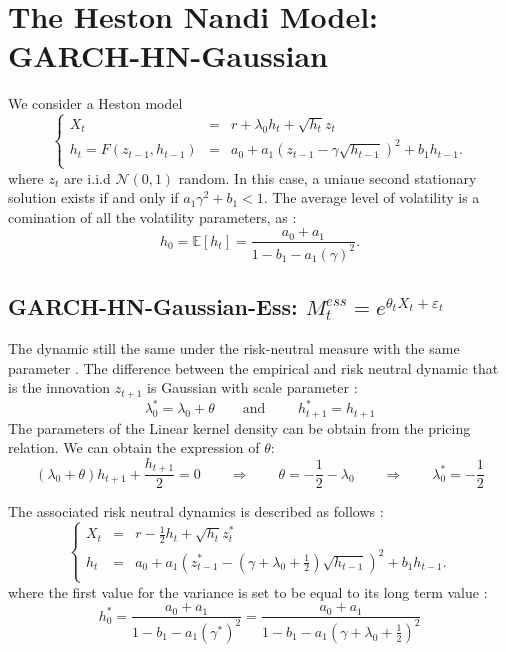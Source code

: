 \documentclass[preprint,times,12pt]{elsarticle}
\begin{document}
\section{The Heston Nandi Model: GARCH-HN-Gaussian}
We consider a Heston model
\begin{equation}\label{HestonNandistar}
\left\{
  \begin{array}{rcl}
X_{t}& = & r+\lambda_{0}h_{t} + \sqrt{h_{t}}z_{t}\\
h_{t}=F\left(z_{t-1},h_{t-1} \right) & = & a_{0}+a_{1}\left(z_{t-1}-\gamma\sqrt{h_{t-1}} \right)^{2}+b_{1}h_{t-1}.\\
  \end{array}
\right.
\end{equation}
where $ z_{t} $ are i.i.d $ \mathcal{N}(0,1) $ random. In this case, a uniaue second stationary solution  exists if and only if $a_{1}\gamma^{2}+b_{1}<1  $. The average level of volatility is a comination of all the volatility parameters, as :
\begin{equation*}
h_{0}=\mathbb{E}\left[h_{t}\right] =\dfrac{a_{0}+a_{1}}{1-b_{1}-a_{1}(\gamma)^{2}}.
\end{equation*}

\subsection{ GARCH-HN-Gaussian-Ess: $M^{ess}_{t}=e^{\theta_{t}X_{t}+\varepsilon_{t}}$}

The dynamic still the same under the risk-neutral measure with the same parameter . The difference between the empirical and risk neutral dynamic that is the innovation $ z_{t+1} $ is Gaussian with scale parameter :
\begin{equation*}
\lambda_{0}^{*}=\lambda_{0}+\theta  \qquad \text{and }\qquad h_{t+1}^{*}=h_{t+1}
\end{equation*}
The parameters of the Linear kernel density can be obtain from the pricing relation.  We can obtain the expression of $\theta$: 
\begin{equation*}
(\lambda_{0}+\theta)h_{t+1}+\frac{h_{t+1}}{2}=0 \qquad\Rightarrow  \qquad\theta =-\frac{1}{2}-\lambda_{0}\qquad\Rightarrow  \qquad \lambda_{0}^{*}=-\frac{1}{2}
\end{equation*}

The associated risk neutral dynamics is described as follows :
\begin{equation}\label{HestonNandiriskdyn}
\left\{
  \begin{array}{rcl}
X_{t}& = & r-\frac{1}{2}h_{t} + \sqrt{h_{t}}z_{t}^{*}\\
h_{t}& = & a_{0}+a_{1}\left(z_{t-1}^{*}-\left(\gamma+\lambda_{0}+\frac{1}{2}\right)\sqrt{h_{t-1}} \right)^{2}+b_{1}h_{t-1}.\\
  \end{array}
\right.
\end{equation}
where the first value for the variance is set to be equal to its long term value :
\begin{equation}
h_{0}^{*}=\dfrac{a_{0}+a_{1}}{1-b_{1}-a_{1}(\gamma^{*})^{2}}=\dfrac{a_{0}+a_{1}}{1-b_{1}-a_{1}(\gamma+\lambda_{0}+\frac{1}{2})^{2}}
\end{equation}
\end{document}

